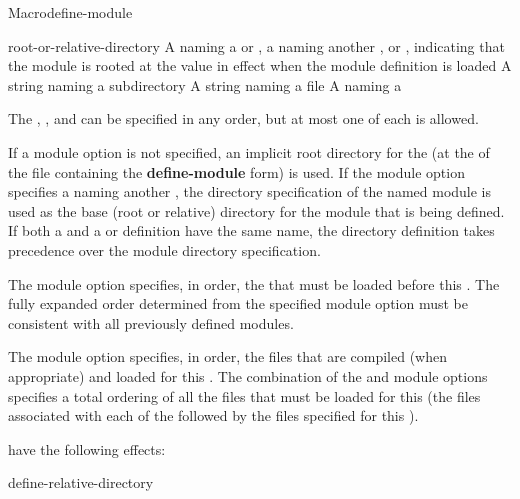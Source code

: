\documentclass[10pt,twoside,english,pdftex]{article}
\begin{document}
\begin{functiondoc}{Macro}{define-module}{\superstar}
\fnterms
\begin{args}{root-or-relative-directory}
 A  naming a  or
  , a  naming another , or
  \nil{}, indicating that the module is rooted at the 
  value in effect when the module definition is loaded
\arg[subdirectory] A string naming a subdirectory
 A string naming a file
 A  naming a 
\end{args}

\fndescription The  ,
, and  can be specified in any order,
but at most one of each is allowed.

If a  module option is not specified, an implicit root
directory for the  (at the  of the file
containing the \textbf{define-module} form) is used.  If the 
module option specifies a  naming another , the directory
specification of the named module is used as the base (root or relative)
directory for the module that is being defined.  If both a  and
a  or  definition have the same name,
the directory definition takes precedence over the module directory
specification.

The  module option specifies, in order, the 
that must be loaded before this .  The fully expanded
 order determined from the specified 
module option must be consistent with all previously defined modules.

The  module option specifies, in order, the files that are
compiled (when appropriate) and loaded for this .  The
combination of the  and  module options specifies
a total ordering of all the files that must be loaded for this 
(the files associated with each of the  followed by
the files specified for this ).

 have the following effects: 
%
\W\supp\tabletop
\compilemodulefileoptions

\begin{alsos}{define-relative-directory}
\end{alsos}


\end{functiondoc}
\end{document}
